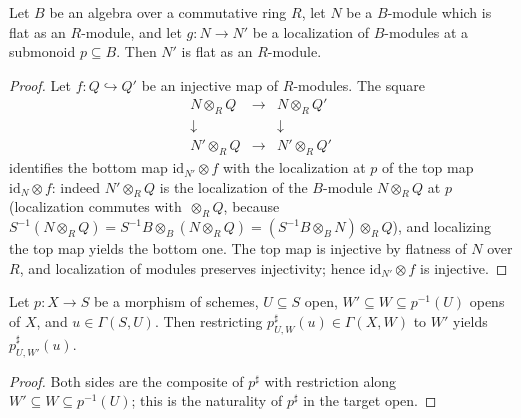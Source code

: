 \begin{lemma}
  \label{mk-lem:flat_localizedModule_algebra}
  \leanok

  Let \(B\) be an algebra over a commutative ring \(R\), let \(N\) be a
  \(B\)-module which is flat as an \(R\)-module, and let
  \(g : N \to N'\) be a localization of \(B\)-modules at a submonoid
  \(p \subseteq B\). Then \(N'\) is flat as an \(R\)-module.
\end{lemma}
\begin{proof}
  \leanok
  Let \(f : Q \hookrightarrow Q'\) be an injective map of \(R\)-modules. The
  square
  \[
    \begin{array}{ccc}
      N \otimes_R Q & \longrightarrow & N \otimes_R Q' \\
      \downarrow & & \downarrow \\
      N' \otimes_R Q & \longrightarrow & N' \otimes_R Q'
    \end{array}
  \]
  identifies the bottom map \(\mathrm{id}_{N'} \otimes f\) with the
  localization at \(p\) of the top map \(\mathrm{id}_N \otimes f\): indeed
  \(N' \otimes_R Q\) is the localization of the \(B\)-module
  \(N \otimes_R Q\) at \(p\) (localization commutes with \(\, \otimes_R Q\),
  because \(S^{-1}(N \otimes_R Q) = S^{-1}B \otimes_B (N \otimes_R Q)
  = (S^{-1}B \otimes_B N) \otimes_R Q\)), and localizing the top map yields
  the bottom one. The top map is injective by flatness of \(N\) over \(R\),
  and localization of modules preserves injectivity; hence
  \(\mathrm{id}_{N'} \otimes f\) is injective.
\end{proof}

\begin{lemma}
  \label{mk-lem:appLE_res_apply}
  \leanok

  Let \(p : X \to S\) be a morphism of schemes, \(U \subseteq S\) open,
  \(W' \subseteq W \subseteq p^{-1}(U)\) opens of \(X\), and
  \(u \in \Gamma(S, U)\). Then restricting
  \(p^\sharp_{U,W}(u) \in \Gamma(X, W)\) to \(W'\) yields
  \(p^\sharp_{U,W'}(u)\).
\end{lemma}
\begin{proof}
  \leanok
  Both sides are the composite of \(p^\sharp\) with restriction along
  \(W' \subseteq W \subseteq p^{-1}(U)\); this is the naturality of
  \(p^\sharp\) in the target open.
\end{proof}


